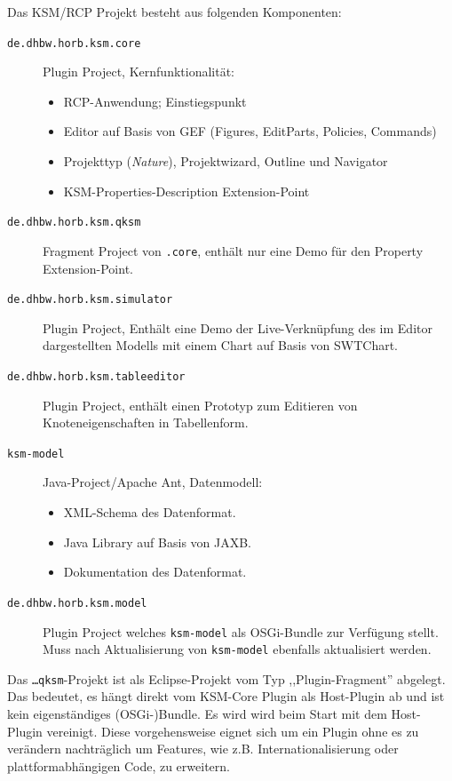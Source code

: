 \documentclass[%
12pt,titlepage,abstracton,DIV=10,BCOR=0.5cm]{scrreprt}
\begin{document}
Das KSM/RCP Projekt besteht aus folgenden Komponenten:
\begin{description}
  \item[\texttt{de.\-dhbw.\-horb.\-ksm.\-core}] Plugin
  Project, Kernfunktionalität:
  \begin{itemize}
    \item RCP-Anwendung; Einstiegspunkt
  	\item Editor auf Basis von GEF (Figures, EditParts, Policies, Commands)
  	\item Projekttyp (\textit{Nature}), Projektwizard, Outline und Navigator
  	\item KSM-Properties-Description Extension-Point
  \end{itemize}
  \item[\texttt{de.\-dhbw.\-horb.\-ksm.\-qksm}] Fragment Project von
  \texttt{.core}, enthält nur eine Demo für den Property Extension-Point.
  \item[\texttt{de.\-dhbw.\-horb.\-ksm.\-simulator}] Plugin Project, Enthält eine Demo der
  Live-Verknüpfung des im Editor dargestellten Modells mit einem Chart auf
  Basis von SWTChart.
  \item[\texttt{de.\-dhbw.\-horb.\-ksm.\-tableeditor}] Plugin Project, enthält
  einen Prototyp zum Editieren von Knoteneigenschaften in Tabellenform.
  \item[\texttt{ksm-model}]
  Java-Project/Apache Ant, Datenmodell:
  \begin{itemize}
    \item XML-Schema des Datenformat.
    \item Java Library auf Basis von JAXB.
    \item Dokumentation des Datenformat.
  \end{itemize}
  \item[\texttt{de.\-dhbw.\-horb.\-ksm.\-model}] Plugin Project welches
  \texttt{ksm-model} als OSGi-Bundle zur Verfügung stellt. Muss nach
  Aktualisierung von \texttt{ksm-model} ebenfalls aktualisiert werden.
\end{description}

Das \texttt{\ldots qksm}-Projekt ist als Eclipse-Projekt vom Typ
,,Plugin-Fragment'' abgelegt. Das bedeutet, es hängt direkt vom KSM-Core Plugin
als Host-Plugin ab und ist kein eigenständiges (OSGi-)Bundle. Es wird wird beim
Start mit dem Host-Plugin vereinigt. Diese vorgehensweise eignet sich um ein
Plugin ohne es zu verändern nachträglich um Features, wie z.B.
Internationalisierung oder plattformabhängigen Code, zu erweitern.
\end{document}
